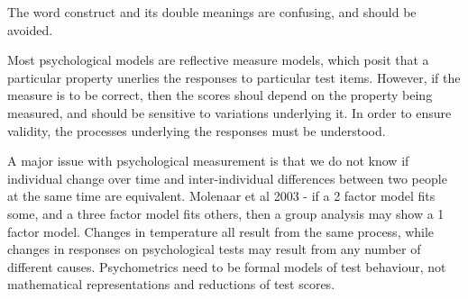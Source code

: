 The word construct and its double meanings are confusing, and should be avoided.

Most psychological models are reflective measure models, which posit that a particular property unerlies the responses to particular test items. However, if the measure is to be correct, then the scores shoul depend on the property being measured, and should be sensitive to variations underlying it.
In order to ensure validity, the processes underlying the responses must be understood. 

A major issue with psychological measurement is that we do not know if individual change over time and inter-individual differences between two people at the same time are equivalent. 
Molenaar et al 2003 - if a 2 factor model fits some, and a three factor model fits others, then a group analysis may show a 1 factor model.
Changes in temperature all result from the same process, while changes in responses on psychological tests may result from any number of different causes. 
Psychometrics need to be formal models of test behaviour, not mathematical representations and reductions of test scores.  